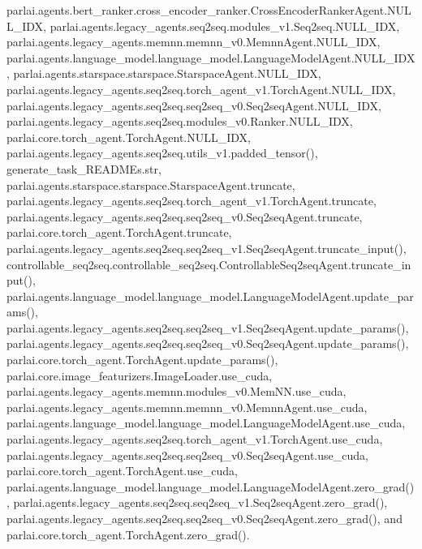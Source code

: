 parlai.\+agents.\+bert\+\_\+ranker.\+cross\+\_\+encoder\+\_\+ranker.\+Cross\+Encoder\+Ranker\+Agent.\+N\+U\+L\+L\+\_\+\+I\+DX, parlai.\+agents.\+legacy\+\_\+agents.\+seq2seq.\+modules\+\_\+v1.\+Seq2seq.\+N\+U\+L\+L\+\_\+\+I\+DX, parlai.\+agents.\+legacy\+\_\+agents.\+memnn.\+memnn\+\_\+v0.\+Memnn\+Agent.\+N\+U\+L\+L\+\_\+\+I\+DX, parlai.\+agents.\+language\+\_\+model.\+language\+\_\+model.\+Language\+Model\+Agent.\+N\+U\+L\+L\+\_\+\+I\+DX, parlai.\+agents.\+starspace.\+starspace.\+Starspace\+Agent.\+N\+U\+L\+L\+\_\+\+I\+DX, parlai.\+agents.\+legacy\+\_\+agents.\+seq2seq.\+torch\+\_\+agent\+\_\+v1.\+Torch\+Agent.\+N\+U\+L\+L\+\_\+\+I\+DX, parlai.\+agents.\+legacy\+\_\+agents.\+seq2seq.\+seq2seq\+\_\+v0.\+Seq2seq\+Agent.\+N\+U\+L\+L\+\_\+\+I\+DX, parlai.\+agents.\+legacy\+\_\+agents.\+seq2seq.\+modules\+\_\+v0.\+Ranker.\+N\+U\+L\+L\+\_\+\+I\+DX, parlai.\+core.\+torch\+\_\+agent.\+Torch\+Agent.\+N\+U\+L\+L\+\_\+\+I\+DX, parlai.\+agents.\+legacy\+\_\+agents.\+seq2seq.\+utils\+\_\+v1.\+padded\+\_\+tensor(), generate\+\_\+task\+\_\+\+R\+E\+A\+D\+M\+Es.\+str, parlai.\+agents.\+starspace.\+starspace.\+Starspace\+Agent.\+truncate, parlai.\+agents.\+legacy\+\_\+agents.\+seq2seq.\+torch\+\_\+agent\+\_\+v1.\+Torch\+Agent.\+truncate, parlai.\+agents.\+legacy\+\_\+agents.\+seq2seq.\+seq2seq\+\_\+v0.\+Seq2seq\+Agent.\+truncate, parlai.\+core.\+torch\+\_\+agent.\+Torch\+Agent.\+truncate, parlai.\+agents.\+legacy\+\_\+agents.\+seq2seq.\+seq2seq\+\_\+v1.\+Seq2seq\+Agent.\+truncate\+\_\+input(), controllable\+\_\+seq2seq.\+controllable\+\_\+seq2seq.\+Controllable\+Seq2seq\+Agent.\+truncate\+\_\+input(), parlai.\+agents.\+language\+\_\+model.\+language\+\_\+model.\+Language\+Model\+Agent.\+update\+\_\+params(), parlai.\+agents.\+legacy\+\_\+agents.\+seq2seq.\+seq2seq\+\_\+v1.\+Seq2seq\+Agent.\+update\+\_\+params(), parlai.\+agents.\+legacy\+\_\+agents.\+seq2seq.\+seq2seq\+\_\+v0.\+Seq2seq\+Agent.\+update\+\_\+params(), parlai.\+core.\+torch\+\_\+agent.\+Torch\+Agent.\+update\+\_\+params(), parlai.\+core.\+image\+\_\+featurizers.\+Image\+Loader.\+use\+\_\+cuda, parlai.\+agents.\+legacy\+\_\+agents.\+memnn.\+modules\+\_\+v0.\+Mem\+N\+N.\+use\+\_\+cuda, parlai.\+agents.\+legacy\+\_\+agents.\+memnn.\+memnn\+\_\+v0.\+Memnn\+Agent.\+use\+\_\+cuda, parlai.\+agents.\+language\+\_\+model.\+language\+\_\+model.\+Language\+Model\+Agent.\+use\+\_\+cuda, parlai.\+agents.\+legacy\+\_\+agents.\+seq2seq.\+torch\+\_\+agent\+\_\+v1.\+Torch\+Agent.\+use\+\_\+cuda, parlai.\+agents.\+legacy\+\_\+agents.\+seq2seq.\+seq2seq\+\_\+v0.\+Seq2seq\+Agent.\+use\+\_\+cuda, parlai.\+core.\+torch\+\_\+agent.\+Torch\+Agent.\+use\+\_\+cuda, parlai.\+agents.\+language\+\_\+model.\+language\+\_\+model.\+Language\+Model\+Agent.\+zero\+\_\+grad(), parlai.\+agents.\+legacy\+\_\+agents.\+seq2seq.\+seq2seq\+\_\+v1.\+Seq2seq\+Agent.\+zero\+\_\+grad(), parlai.\+agents.\+legacy\+\_\+agents.\+seq2seq.\+seq2seq\+\_\+v0.\+Seq2seq\+Agent.\+zero\+\_\+grad(), and parlai.\+core.\+torch\+\_\+agent.\+Torch\+Agent.\+zero\+\_\+grad().



